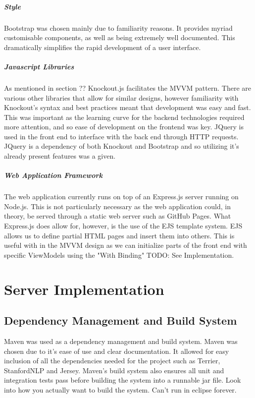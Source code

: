 \documentclass{l4proj}
\begin{document}
\paragraph{Style}
Bootstrap was chosen mainly due to familiarity reasons. It provides myriad customisable components, as well as being extremely well documented. This dramatically simplifies the rapid development of a user interface.

\paragraph{Javascript Libraries}
As mentioned in section ?? Knockout.js facilitates the MVVM pattern. There are various other libraries that allow for similar designs, however familiarity with Knockout's syntax and best practices meant that development was easy and fast.
This was important as the learning curve for the backend technologies required more attention, and so ease of development on the frontend was key.
JQuery is used in the front end to interface with the back end through HTTP requests. JQuery is a dependency of both Knockout and Bootstrap and so utilizing it's already present features was a given.

\paragraph{Web Application Framework}
The web application currently runs on top of an Express.js server running on Node.js. This is not particularly necessary as the web application could, in theory, be served through a static web server such as GitHub Pages. What Express.js does allow for, however, is the use of the EJS template system. EJS allows us to define partial HTML pages and insert them into others. This is useful with in the MVVM design as we can initialize parts of the front end with specific ViewModels using the "With Binding" TODO: See Implementation.

\chapter{Server Implementation}
\section{Dependency Management and Build System}
Maven was used as a dependency management and build system. Maven was chosen due to it's ease of use and clear documentation. It allowed for easy inclusion of all the dependencies needed for the project such as Terrier, StanfordNLP and Jersey. Maven's build system also ensures all unit and integration tests pass before building the system into a runnable jar file. Look into how you actually want to build the system. Can't run in eclipse forever.
\end{document}
